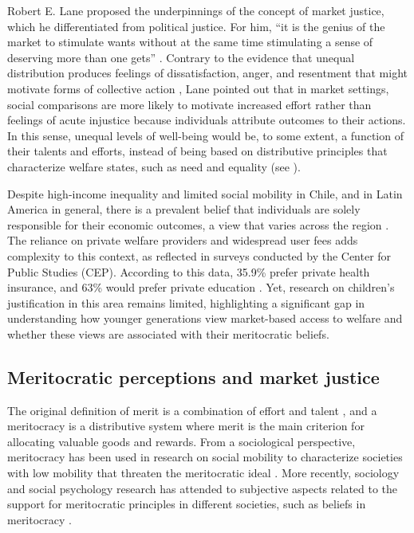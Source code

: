 \documentclass[
    behavsci,
    article,
    submit,
moreauthors
]{mdpi}
\begin{document}
Robert E. Lane proposed the underpinnings of the concept of market
justice, which he differentiated from political justice. For him, ``it
is the genius of the market to stimulate wants without at the same time
stimulating a sense of deserving more than one gets''
\citep[p.384]{lane_market_1986}. Contrary to the evidence that
unequal distribution produces feelings of dissatisfaction, anger, and
resentment that might motivate forms of collective action
\citep{greitemeyer_subjective_2016, mishra_subjective_2015, smith_relative_2012, power_deprivationprotest_2018},
Lane pointed out that in market settings, social comparisons are more
likely to motivate increased effort rather than feelings of acute
injustice because individuals attribute outcomes to their actions. In
this sense, unequal levels of well-being would be, to some extent, a
function of their talents and efforts, instead of being based on
distributive principles that characterize welfare states, such as need
and equality (see \citep{wilson_role_2003}).

Despite high-income inequality and limited social mobility in Chile, and
in Latin America in general, there is a prevalent belief that
individuals are solely responsible for their economic outcomes, a view
that varies across the region
\citep{bucca_merit_2016, chong_mystery_2008, torche_intergenerational_2014, salgado_inequality_2023}.
The reliance on private welfare providers and widespread user fees
\citep{molyneux_neoliberal_2008} adds complexity to this context, as
reflected in surveys conducted by the Center for Public Studies (CEP).
According to this data, 35.9\% prefer private health insurance, and 63\%
would prefer private education
\citep{centrodeestudiospublicos_estudio_2024}. Yet, research on
children's justification in this area remains limited, highlighting a
significant gap in understanding how younger generations view
market-based access to welfare and whether these views are associated
with their meritocratic beliefs.

\subsection{Meritocratic perceptions and market
justice}\label{meritocratic-perceptions-and-market-justice}

The original definition of merit is a combination of effort and talent
\citep{young_rise_1958}, and a meritocracy is a distributive system
where merit is the main criterion for allocating valuable goods and
rewards. From a sociological perspective, meritocracy has been used in
research on social mobility to characterize societies with low mobility
that threaten the meritocratic ideal \citep{goldthorpe_myth_2003}. More
recently, sociology and social psychology research has attended to
subjective aspects related to the support for meritocratic principles in
different societies, such as beliefs in meritocracy
\citep{castillo_multidimensional_2023, mijs_unfulfillable_2016, mijs_paradox_2019}.
\end{document}
